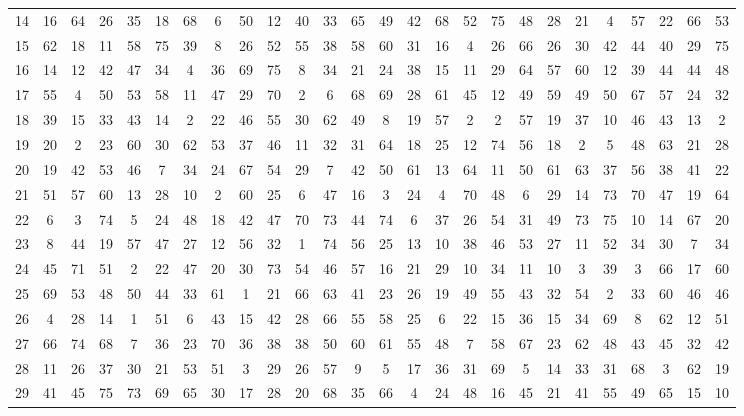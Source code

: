 \begin{table}
\begin{tabular}{c c c c c c c c c c c c c c c c c c c c c c c c c c }
14 & 16 & 64 & 26 & 35 & 18 & 68 & 6 & 50 & 12 & 40 & 33 & 65 & 49 & 42 & 68 & 52 & 75 & 48 & 28 & 21 & 4 & 57 & 22 & 66 & 53 \\
15 & 62 & 18 & 11 & 58 & 75 & 39 & 8 & 26 & 52 & 55 & 38 & 58 & 60 & 31 & 16 & 4 & 26 & 66 & 26 & 30 & 42 & 44 & 40 & 29 & 75 \\
16 & 14 & 12 & 42 & 47 & 34 & 4 & 36 & 69 & 75 & 8 & 34 & 21 & 24 & 38 & 15 & 11 & 29 & 64 & 57 & 60 & 12 & 39 & 44 & 44 & 48 \\
17 & 55 & 4 & 50 & 53 & 58 & 11 & 47 & 29 & 70 & 2 & 6 & 68 & 69 & 28 & 61 & 45 & 12 & 49 & 59 & 49 & 50 & 67 & 57 & 24 & 32 \\
18 & 39 & 15 & 33 & 43 & 14 & 2 & 22 & 46 & 55 & 30 & 62 & 49 & 8 & 19 & 57 & 2 & 2 & 57 & 19 & 37 & 10 & 46 & 43 & 13 & 2 \\
19 & 20 & 2 & 23 & 60 & 30 & 62 & 53 & 37 & 46 & 11 & 32 & 31 & 64 & 18 & 25 & 12 & 74 & 56 & 18 & 2 & 5 & 48 & 63 & 21 & 28 \\
20 & 19 & 42 & 53 & 46 & 7 & 34 & 24 & 67 & 54 & 29 & 7 & 42 & 50 & 61 & 13 & 64 & 11 & 50 & 61 & 63 & 37 & 56 & 38 & 41 & 22 \\
21 & 51 & 57 & 60 & 13 & 28 & 10 & 2 & 60 & 25 & 6 & 47 & 16 & 3 & 24 & 4 & 70 & 48 & 6 & 29 & 14 & 73 & 70 & 47 & 19 & 64 \\
22 & 6 & 3 & 74 & 5 & 24 & 48 & 18 & 42 & 47 & 70 & 73 & 44 & 74 & 6 & 37 & 26 & 54 & 31 & 49 & 73 & 75 & 10 & 14 & 67 & 20 \\
23 & 8 & 44 & 19 & 57 & 47 & 27 & 12 & 56 & 32 & 1 & 74 & 56 & 25 & 13 & 10 & 38 & 46 & 53 & 27 & 11 & 52 & 34 & 30 & 7 & 34 \\
24 & 45 & 71 & 51 & 2 & 22 & 47 & 20 & 30 & 73 & 54 & 46 & 57 & 16 & 21 & 29 & 10 & 34 & 11 & 10 & 3 & 39 & 3 & 66 & 17 & 60 \\
25 & 69 & 53 & 48 & 50 & 44 & 33 & 61 & 1 & 21 & 66 & 63 & 41 & 23 & 26 & 19 & 49 & 55 & 43 & 32 & 54 & 2 & 33 & 60 & 46 & 46 \\
26 & 4 & 28 & 14 & 1 & 51 & 6 & 43 & 15 & 42 & 28 & 66 & 55 & 58 & 25 & 6 & 22 & 15 & 36 & 15 & 34 & 69 & 8 & 62 & 12 & 51 \\
27 & 66 & 74 & 68 & 7 & 36 & 23 & 70 & 36 & 38 & 38 & 50 & 60 & 61 & 55 & 48 & 7 & 58 & 67 & 23 & 62 & 48 & 43 & 45 & 32 & 42 \\
28 & 11 & 26 & 37 & 30 & 21 & 53 & 51 & 3 & 29 & 26 & 57 & 9 & 5 & 17 & 36 & 31 & 69 & 5 & 14 & 33 & 31 & 68 & 3 & 62 & 19 \\
29 & 41 & 45 & 75 & 73 & 69 & 65 & 30 & 17 & 28 & 20 & 68 & 35 & 66 & 4 & 24 & 48 & 16 & 45 & 21 & 41 & 55 & 49 & 65 & 15 & 10 \\

\end{tabular}
\end{table}
